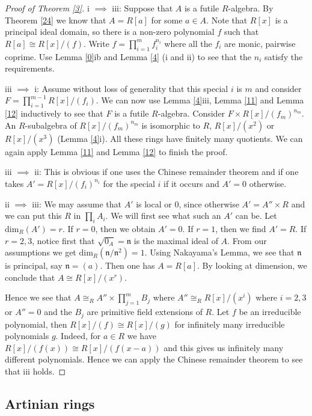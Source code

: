 \documentclass{amsart}
\theoremstyle{plain}
\theoremstyle{definition}
\begin{document}
\begin{proof}[Proof of Theorem \ref{3}]
i $\implies$ iii: Suppose that $A$ is a futile $R$-algebra. By Theorem \ref{24} we know that $A=R[a]$ for some $a \in A$. Note
that $R[x]$ is a principal ideal domain, so there is a non-zero polynomial $f$ such that $R[a] \cong R[x]/(f)$. Write $f= \prod_{i=1}^m f_i^{n_i}$
where all the $f_i$ are monic, pairwise coprime. Use Lemma \ref{0}ib and Lemma \ref{4} (i and ii) to see that the $n_i$ satisfy the requirements. 

iii $\implies$ i: Assume without loss of generality that this special $i$ is $m$ and
consider
$F=\prod_{i=1}^{m-1}R[x]/(f_i)$. We can now use Lemma \ref{4}iii, Lemma \ref{11} and Lemma \ref{12} inductively to see that $F$ is a futile
$R$-algebra.
Consider $F \times R[x]/(f_m)^{n_m}$. An $R$-subalgebra of $R[x]/(f_m)^{n_m}$ is isomorphic to $R$, $R[x]/(x^2)$ or $R[x]/(x^3)$ (Lemma
\ref{4}i). All these rings have finitely many quotients. We can again apply Lemma \ref{11} and Lemma \ref{12} to finish the proof.

iii $\implies$ ii: This is obvious if one uses the Chinese remainder theorem and if one takes $A'=R[x]/(f_i)^{n_i}$ for the special $i$ if it
occurs and $A'=0$ otherwise. 

ii $\implies$ iii: We may assume that $A'$ is local or $0$, since otherwise $A'=A'' \times R$ and we can put this $R$ in $\prod_i A_i$. We will first
see what such an $A'$ can be. Let $\mathrm{dim}_R(A')=r$. If $r=0$, then we obtain $A'=0$.
If $r=1$, then we find $A'=R$.
If $r=2, 3$, notice first that $\sqrt{0_A}=\mathfrak{n}$ is the maximal ideal of $A$. From our assumptions we get
$\mathrm{dim}_R(\mathfrak{n}/\mathfrak{n}^2)=1$. Using Nakayama's Lemma, we see that $\mathfrak{n}$ is principal, say $\mathfrak{n}=(a)$. Then
one has $A=R[a]$. By looking at dimension, we conclude that $A \cong R[x]/(x^r)$.   

Hence we see that $A \cong_R A'' \times \prod_{j=1}^m B_j$ where $A'' \cong_R R[x]/(x^i)$ where $i=2,3$ or $A''=0$ and the $B_j$ are primitive field
extensions of $R$. Let $f$ be an irreducible polynomial, then $R[x]/(f) \cong R[x]/(g)$ for infinitely many irreducible polynomials $g$. Indeed, for
$a \in R$ we have $R[x]/(f(x)) \cong R[x]/(f(x-a))$ and this gives us infinitely many different polynomials. Hence we can apply the Chinese remainder
theorem to see that iii holds.

\end{proof}

\subsection{Artinian rings} \label{801}
\end{document}
